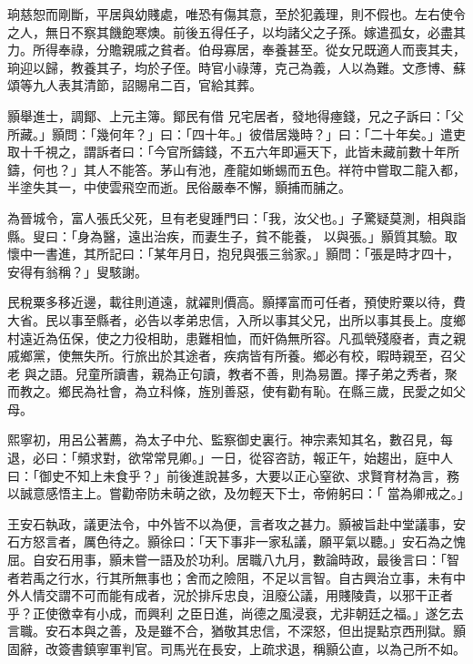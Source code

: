 \begin{pinyinscope}
 珦慈恕而剛斷，平居與幼賤處，唯恐有傷其意，至於犯義理，則不假也。左右使令之人，無日不察其饑飽寒燠。前後五得任子，以均諸父之子孫。嫁遣孤女，必盡其力。所得奉祿，分贍親戚之貧者。伯母寡居，奉養甚至。從女兄既適人而喪其夫，珦迎以歸，教養其子，均於子侄。時官小祿薄，克己為義，人以為難。文彥博、蘇頌等九人表其清節，詔賜帛二百，官給其葬。



 顥舉進士，調鄮、上元主簿。鄮民有借
 兄宅居者，發地得瘞錢，兄之子訴曰：「父所藏。」顥問：「幾何年？」曰：「四十年。」彼借居幾時？」曰：「二十年矣。」遣吏取十千視之，謂訴者曰：「今官所鑄錢，不五六年即遍天下，此皆未藏前數十年所鑄，何也？」其人不能答。茅山有池，產龍如蜥蜴而五色。祥符中嘗取二龍入都，半塗失其一，中使雲飛空而逝。民俗嚴奉不懈，顥捕而脯之。



 為晉城令，富人張氏父死，旦有老叟踵門曰：「我，汝父也。」子驚疑莫測，相與詣縣。叟曰：「身為醫，遠出治疾，而妻生子，貧不能養，
 以與張。」顥質其驗。取懷中一書進，其所記曰：「某年月日，抱兒與張三翁家。」顥問：「張是時才四十，安得有翁稱？」叟駭謝。



 民稅粟多移近邊，載往則道遠，就糴則價高。顥擇富而可任者，預使貯粟以待，費大省。民以事至縣者，必告以孝弟忠信，入所以事其父兄，出所以事其長上。度鄉村遠近為伍保，使之力役相助，患難相恤，而奸偽無所容。凡孤煢殘廢者，責之親戚鄉黨，使無失所。行旅出於其途者，疾病皆有所養。鄉必有校，暇時親至，召父老
 與之語。兒童所讀書，親為正句讀，教者不善，則為易置。擇子弟之秀者，聚而教之。鄉民為社會，為立科條，旌別善惡，使有勸有恥。在縣三歲，民愛之如父母。



 熙寧初，用呂公著薦，為太子中允、監察御史裏行。神宗素知其名，數召見，每退，必曰：「頻求對，欲常常見卿。」一日，從容咨訪，報正午，始趨出，庭中人曰：「御史不知上未食乎？」前後進說甚多，大要以正心窒欲、求賢育材為言，務以誠意感悟主上。嘗勸帝防未萌之欲，及勿輕天下士，帝俯躬曰：「
 當為卿戒之。」



 王安石執政，議更法令，中外皆不以為便，言者攻之甚力。顥被旨赴中堂議事，安石方怒言者，厲色待之。顥徐曰：「天下事非一家私議，願平氣以聽。」安石為之愧屈。自安石用事，顥未嘗一語及於功利。居職八九月，數論時政，最後言曰：「智者若禹之行水，行其所無事也；舍而之險阻，不足以言智。自古興治立事，未有中外人情交謂不可而能有成者，況於排斥忠良，沮廢公議，用賤陵貴，以邪干正者乎？正使徼幸有小成，而興利
 之臣日進，尚德之風浸衰，尤非朝廷之福。」遂乞去言職。安石本與之善，及是雖不合，猶敬其忠信，不深怒，但出提點京西刑獄。顥固辭，改簽書鎮寧軍判官。司馬光在長安，上疏求退，稱顥公直，以為己所不如。




\end{pinyinscope}
